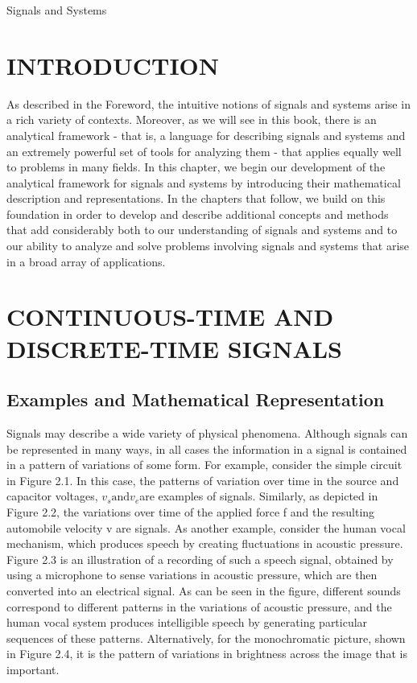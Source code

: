 \documentclass{report}
\begin{document}
Signals and Systems

\section*{INTRODUCTION}

As described in the Foreword, the intuitive notions of signals and systems arise in a rich variety of contexts. Moreover, as we will see in this
book, there is an analytical framework - that is, a language for describing signals and systems and an extremely powerful set of tools for analyzing
them - that applies equally well to problems in many fields. In this chapter, we begin our development of the analytical framework for signals and
systems by introducing their mathematical description and representations. In the chapters that follow, we build on this foundation in order to develop
and describe additional concepts and methods that add considerably both to our understanding of signals and systems and to our ability to analyze
and solve problems involving signals and systems that arise in a broad array of applications.

\section*{CONTINUOUS-TIME AND DISCRETE-TIME SIGNALS}

\subsection*{Examples and Mathematical Representation}

Signals may describe a wide variety of physical phenomena. Although signals can be represented in many ways, in all cases the information in a signal
is contained in a pattern of variations of some form. For example, consider the simple circuit in Figure 2.1. In this case, the patterns of variation
over time in the source and capacitor voltages, \(v_s \text{and} v_e\)are examples of signals. Similarly, as depicted in Figure 2.2, the variations
over time of the applied force f and the resulting automobile velocity v are signals. As another example, consider the human vocal mechanism, which
produces speech by creating fluctuations in acoustic pressure. Figure 2.3 is an illustration of a recording of such a speech signal, obtained by
using a microphone to sense variations in acoustic pressure, which are then converted into an electrical signal. As can be seen in the figure, different
sounds correspond to different patterns in the variations of acoustic pressure, and the human vocal system produces intelligible speech by generating
particular sequences of these patterns. Alternatively, for the monochromatic picture, shown in Figure 2.4, it is the pattern of variations in brightness
across the image that is important.
\end{document}
